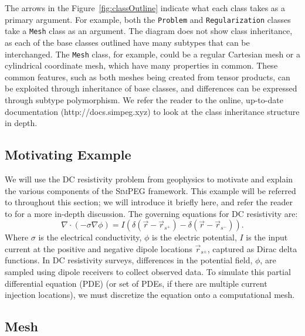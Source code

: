 \documentclass[preprint,review,3p,times,onecolumn,authoryear]{elsarticle}
\newcommand{\SimPEG}{\textsc{SimPEG}\xspace}
\newcommand{\Mesh}{\texttt{Mesh}\xspace}
\newcommand{\Problem}{\texttt{Problem}\xspace}
\newcommand{\Regularization}{\texttt{Regularization}\xspace}
\begin{document}
The arrows in the Figure~\ref{fig:classOutline} indicate what each class
takes as a primary argument. For example, both the \Problem and \Regularization
classes take a \Mesh class as an argument. The diagram
does not show class inheritance, as each of the base classes outlined have
many subtypes that can be interchanged. The \Mesh class, for example, could
be a regular Cartesian mesh or a cylindrical coordinate mesh, which have
many properties in common. These common features, such as both meshes
being created from tensor products, can be exploited through inheritance
of base classes, and differences can be expressed through subtype
polymorphism. We refer the reader to the online, up-to-date documentation (http://docs.simpeg.xyz) to look at the class inheritance structure in depth.

\subsection{Motivating Example}
\label{sub:motivating_example}
We will use the DC resistivity problem from geophysics
to motivate and explain the various components of the \SimPEG framework. This example will be
referred to throughout this section; we will introduce it briefly here,
and refer the reader to \cite{Pidlisecky2007} %
for a more in-depth discussion.
The governing equations for DC resistivity are:
{%
\begin{equation}
\label{eq:dc}
\nabla \cdot ( - \sigma \nabla \phi) = I(\delta(\vec{r}-\vec{r}_{s^+}) - \delta(\vec{r}-\vec{r}_{s^-})).
\end{equation}
}
Where $\sigma$ is the electrical conductivity,
$\phi$ is the electric potential,
$I$ is the input current at the positive and negative dipole locations $\vec{r}_{s^\pm}$, captured as Dirac delta functions.
In DC resistivity surveys, differences in the potential field, $\phi$, are sampled using dipole receivers to collect observed data.
To simulate this partial differential equation (PDE) (or set of PDEs, if there are multiple current injection locations), we must discretize the equation onto a computational mesh.

\subsection{Mesh}
\label{sub:mesh}
\end{document}
